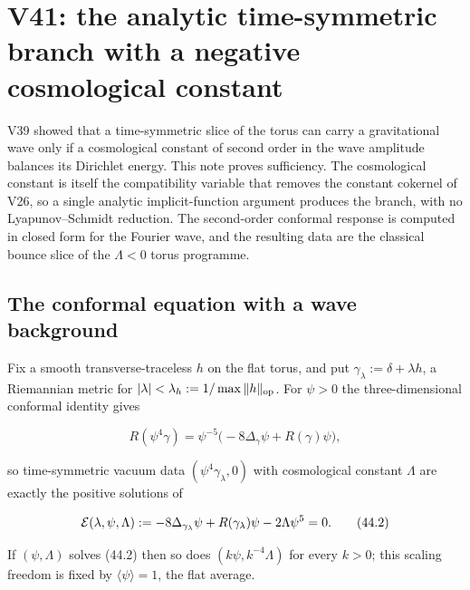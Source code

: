\documentclass[11pt]{article}
\theoremstyle{remark}
\begin{document}
\section{V41: the analytic time-symmetric branch with a negative cosmological constant}
\label{sec:v19v41}

V39 showed that a time-symmetric slice of the torus can carry a
gravitational wave only if a cosmological constant of second order in
the wave amplitude balances its Dirichlet energy.  This note proves
sufficiency.  The cosmological constant is itself the compatibility
variable that removes the constant cokernel of V26, so a single analytic
implicit-function argument produces the branch, with no Lyapunov--Schmidt
reduction.  The second-order conformal response is computed in closed
form for the Fourier wave, and the resulting data are the classical
bounce slice of the \(\Lambda<0\) torus programme.

\subsection{The conformal equation with a wave background}

Fix a smooth transverse-traceless \(h\) on the flat torus, and put
\(\gamma_\lambda:=\delta+\lambda h\), a Riemannian metric for
\(|\lambda|<\lambda_h:=1/\max\|h\|_{\rm op}\).  For \(\psi>0\) the
three-dimensional conformal identity gives

\[
 R(\psi^4\gamma)=\psi^{-5}\bigl(-8\Delta_\gamma\psi+R(\gamma)\psi\bigr),
                                                                    \tag{44.1}
\]

so time-symmetric vacuum data \((\psi^4\gamma_\lambda,0)\) with
cosmological constant \(\Lambda\) are exactly the positive solutions of

\[
 {\cal E}(\lambda,\psi,\Lambda):=
 -8\Delta_{\gamma_\lambda}\psi+R(\gamma_\lambda)\psi-2\Lambda\psi^5=0.
                                                                    \tag{44.2}
\]

If \((\psi,\Lambda)\) solves (44.2) then so does
\((k\psi,k^{-4}\Lambda)\) for every \(k>0\); this scaling freedom is
fixed by \(\langle\psi\rangle=1\), the flat average.
\end{document}
